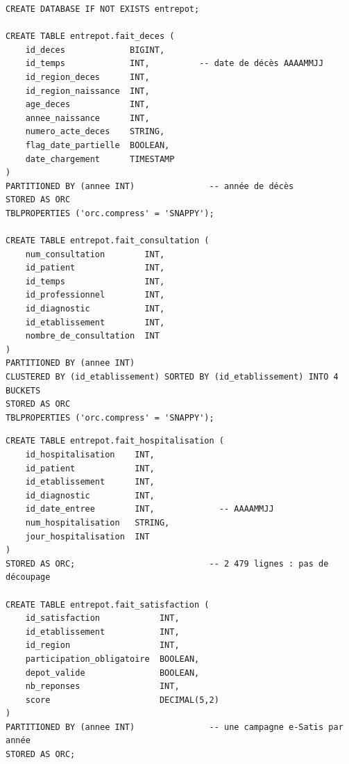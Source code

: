\begin{center}
\begin{minipage}{0.92\textwidth}
\begin{tcolorbox}[colback=title2!6,colframe=title1,title=\textbf{Faits Décès et Consultation},fonttitle=\small,boxsep=2pt]
\begin{verbatim}
CREATE DATABASE IF NOT EXISTS entrepot;

CREATE TABLE entrepot.fait_deces (
    id_deces             BIGINT,
    id_temps             INT,          -- date de décès AAAAMMJJ
    id_region_deces      INT,
    id_region_naissance  INT,
    age_deces            INT,
    annee_naissance      INT,
    numero_acte_deces    STRING,
    flag_date_partielle  BOOLEAN,
    date_chargement      TIMESTAMP
)
PARTITIONED BY (annee INT)               -- année de décès
STORED AS ORC
TBLPROPERTIES ('orc.compress' = 'SNAPPY');

CREATE TABLE entrepot.fait_consultation (
    num_consultation        INT,
    id_patient              INT,
    id_temps                INT,
    id_professionnel        INT,
    id_diagnostic           INT,
    id_etablissement        INT,
    nombre_de_consultation  INT
)
PARTITIONED BY (annee INT)
CLUSTERED BY (id_etablissement) SORTED BY (id_etablissement) INTO 4 BUCKETS
STORED AS ORC
TBLPROPERTIES ('orc.compress' = 'SNAPPY');
\end{verbatim}
\end{tcolorbox}
\end{minipage}
\end{center}

\begin{center}
\begin{minipage}{0.92\textwidth}
\begin{tcolorbox}[colback=title2!6,colframe=title1,title=\textbf{Faits Hospitalisation et Satisfaction},fonttitle=\small,boxsep=2pt]
\begin{verbatim}
CREATE TABLE entrepot.fait_hospitalisation (
    id_hospitalisation    INT,
    id_patient            INT,
    id_etablissement      INT,
    id_diagnostic         INT,
    id_date_entree        INT,             -- AAAAMMJJ
    num_hospitalisation   STRING,
    jour_hospitalisation  INT
)
STORED AS ORC;                           -- 2 479 lignes : pas de découpage

CREATE TABLE entrepot.fait_satisfaction (
    id_satisfaction            INT,
    id_etablissement           INT,
    id_region                  INT,
    participation_obligatoire  BOOLEAN,
    depot_valide               BOOLEAN,
    nb_reponses                INT,
    score                      DECIMAL(5,2)
)
PARTITIONED BY (annee INT)               -- une campagne e-Satis par année
STORED AS ORC;
\end{verbatim}
\end{tcolorbox}
\end{minipage}
\end{center}

